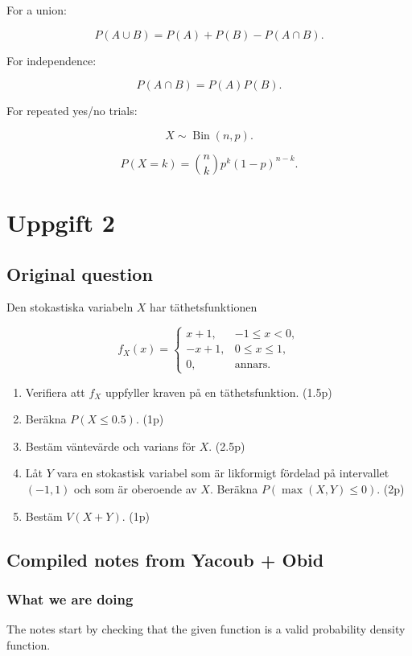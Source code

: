 \documentclass[10pt]{article}
\begin{document}
For a union:

\[
P(A\cup B)
=P(A)+P(B)-P(A\cap B).
\]

For independence:

\[
P(A\cap B)=P(A)P(B).
\]

For repeated yes/no trials:

\[
X\sim \operatorname{Bin}(n,p).
\]

\[
P(X=k)
=
\binom{n}{k}p^k(1-p)^{n-k}.
\]

\section*{Uppgift 2}

\subsection*{Original question}
Den stokastiska variabeln \(X\) har täthetsfunktionen

\[
f_X(x)=
\begin{cases}
x+1, & -1\le x<0,\\
-x+1, & 0\le x\le 1,\\
0, & \text{annars}.
\end{cases}
\]

\begin{enumerate}[label=\alph*)]
\item Verifiera att \(f_X\) uppfyller kraven på en
täthetsfunktion.
\hfill (1.5p)

\item Beräkna \(P(X\le 0.5)\).
\hfill (1p)

\item Bestäm väntevärde och varians för \(X\).
\hfill (2.5p)

\item Låt \(Y\) vara en stokastisk variabel som är
likformigt fördelad på intervallet \((-1,1)\) och som
är oberoende av \(X\).
Beräkna \(P(\max(X,Y)\le 0)\).
\hfill (2p)

\item Bestäm \(V(X+Y)\).
\hfill (1p)
\end{enumerate}

\subsection*{Compiled notes from Yacoub + Obid}

\subsubsection*{What we are doing}
The notes start by checking that the given function is
a valid probability density function.
\end{document}
